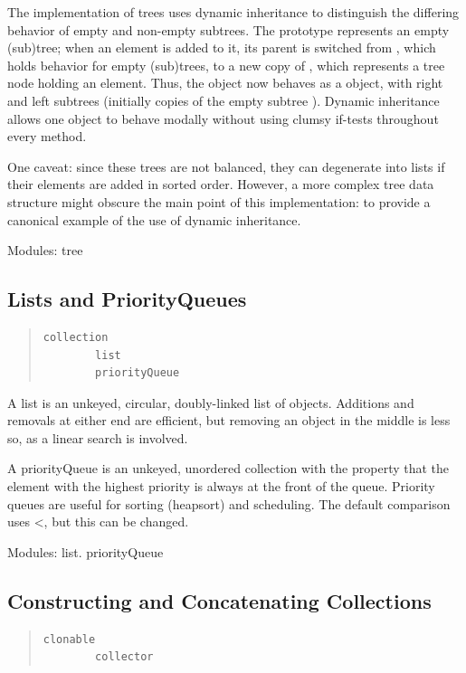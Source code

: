 \documentclass[letterpaper,10pt,english]{sphinxmanual}
\begin{document}
The implementation of trees uses dynamic inheritance to distinguish the differing behavior of empty
and non-empty subtrees. The prototype  represents an empty (sub)tree; when an element
is added to it, its parent is switched from , which holds behavior
for empty (sub)trees, to a new copy of , which represents a tree node holding an element.
Thus, the  object now behaves as a  object, with right and left subtrees
(initially copies of the empty subtree ). Dynamic inheritance allows one object to
behave modally without using clumsy if-tests throughout every method.

One caveat: since these trees are not balanced, they can degenerate into lists if their elements are
added in sorted order. However, a more complex tree data structure might obscure the main point
of this implementation: to provide a canonical example of the use of dynamic inheritance.

Modules: tree


\subsection{Lists and PriorityQueues}
\label{collections:lists-and-priorityqueues}\begin{quote}

\begin{Verbatim}[commandchars=\\\{\}]
collection
        list
        priorityQueue
\end{Verbatim}
\end{quote}

A list is an unkeyed, circular, doubly-linked list of objects. Additions and removals at either end
are efficient, but removing an object in the middle is less so, as a linear search is involved.

A priorityQueue is an unkeyed, unordered collection with the property that the element with the
highest priority is always at the front of the queue. Priority queues are useful for sorting (heapsort)
and scheduling. The default comparison uses \textless{}, but this can be changed.

Modules: list. priorityQueue


\subsection{Constructing and Concatenating Collections}
\label{collections:constructing-and-concatenating-collections}\begin{quote}

\begin{Verbatim}[commandchars=\\\{\}]
clonable
        collector
\end{Verbatim}
\end{quote}
\end{document}
